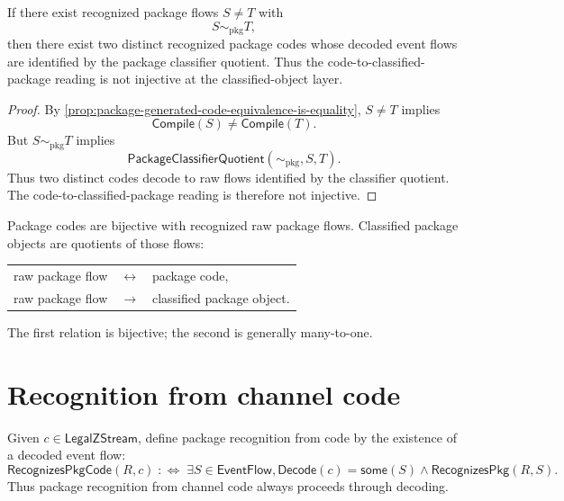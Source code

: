 \begin{proposition}
\label{prop:package-generated-classified-not-code-bijective}
If there exist recognized package flows $S \neq T$ with
$$
  S \sim_{\mathrm{pkg}} T,
$$
then there exist two distinct recognized package codes whose decoded event flows are identified by the package classifier quotient. Thus the code-to-classified-package reading is not injective at the classified-object layer.
\end{proposition}

\begin{proof}
By \autoref{prop:package-generated-code-equivalence-is-equality}, $S \neq T$ implies
$$
  \mathsf{Compile}(S) \neq \mathsf{Compile}(T).
$$
But $S \sim_{\mathrm{pkg}} T$ implies
$$
  \mathsf{PackageClassifierQuotient}(\sim_{\mathrm{pkg}},S,T).
$$
Thus two distinct codes decode to raw flows identified by the classifier quotient. The code-to-classified-package reading is therefore not injective.
\end{proof}

\begin{corollary}
\label{cor:package-generated-raw-code-vs-classified-object}
Package codes are bijective with recognized raw package flows. Classified package objects are quotients of those flows:
\begin{center}
\begin{tabular}{rcl}
  raw package flow & $\longleftrightarrow$ & package code, \\
  raw package flow & $\longrightarrow$ & classified package object.
\end{tabular}
\end{center}
The first relation is bijective; the second is generally many-to-one.
\end{corollary}

\section{Recognition from channel code}
\label{sec:package-generated-recognition-from-code}

\begin{definition}
\label{def:package-generated-recognition-from-code}
Given $c \in \mathsf{LegalZStream}$, define package recognition from code by the existence of a decoded event flow:
$$
  \mathsf{RecognizesPkgCode}(R,c)
  \;:\Longleftrightarrow\;
  \exists S \in \mathsf{EventFlow},
  \mathsf{Decode}(c)=\mathsf{some}(S)
  \wedge
  \mathsf{RecognizesPkg}(R,S).
$$
Thus package recognition from channel code always proceeds through decoding.
\end{definition}

